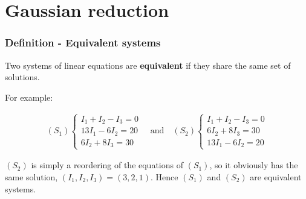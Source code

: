 \documentclass[usenames,dvipsnames,aspectratio=169,10pt]{beamer}
\numberwithin{equation}{section}
\begin{document}
\section{Gaussian reduction}


\begin{frame}
\frametitle{Definition - Equivalent systems}
Two systems of linear equations are \textbf{equivalent} if they share the same set of solutions.

For example:

\begin{align*}
(S_1)
\begin{cases}
    I_1 +   I_2 -   I_3 =  0 \\
 13 I_1 - 6 I_2         = 20 \\
          6 I_2 + 8 I_3 = 30
\end{cases}
\quad\text{and}\quad
(S_2)
\begin{cases}
    I_1 +   I_2 -   I_3 =  0 \\
          6 I_2 + 8 I_3 = 30 \\
 13 I_1 - 6 I_2         = 20 
\end{cases}
\end{align*}

$(S_2)$ is simply a reordering of the equations of $(S_1)$, so it obviously has the same solution, $(I_1, I_2, I_3) = (3,2,1)$. Hence $(S_1)$ and $(S_2)$ are equivalent systems.
\end{frame}
\end{document}
